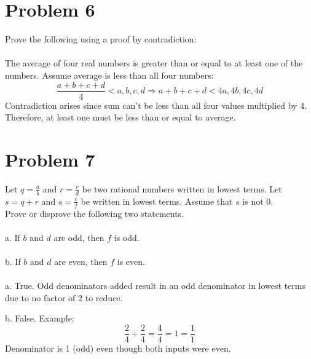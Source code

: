 \documentclass{amsart}
\theoremstyle{definition}
\theoremstyle{Exercise}
\theoremstyle{remark}
\theoremstyle{rule}
\numberwithin{equation}{section}
\begin{document}
 \newpage

\section*{Problem 6}
Prove the following using a proof by contradiction:
\\\\


The average of four real numbers is greater than or equal to at least one of the numbers.
Assume average is less than all four numbers:
\[
\frac{a+b+c+d}{4} < a, b, c, d
\Rightarrow a+b+c+d < 4a, 4b, 4c, 4d
\]
Contradiction arises since sum can’t be less than all four values multiplied by 4. Therefore, at least one must be less than or equal to average.

 \newpage

\section*{Problem 7}

Let $\displaystyle q = \frac{a}{b}$ and $\displaystyle r = \frac{c}{d}$ be two rational numbers written in lowest terms. Let $s = q + r$ and $\displaystyle s = \frac{e}{f}$ be written in lowest terms. Assume that $s$ is not $0$.\\

 Prove or disprove the following two statements.
\\\\
a.  If $b$ and $d$ are odd, then $f$ is odd.
\\\\
b. If $b$ and $d$ are even, then $f$ is even.
\\\\
a. True. Odd denominators added result in an odd denominator in lowest terms due to no factor of 2 to reduce.

b. False. Example:
\[
\frac{2}{4} + \frac{2}{4} = \frac{4}{4} = 1 = \frac{1}{1}
\]
Denominator is 1 (odd) even though both inputs were even.


\newpage
\end{document}

